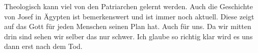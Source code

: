 Theologisch kann viel von den Patriarchen gelernt werden. Auch die Geschichte von Josef in Ägypten ist bemerkenswert und ist immer noch aktuell. Diese zeigt auf das Gott für jeden Menschen seinen Plan hat. Auch für uns. Da wir mitten drin sind sehen wir selber das nur schwer. Ich glaube so richtig klar wird es uns dann erst nach dem Tod.


%
%
%
%
%

%
%
%
%



